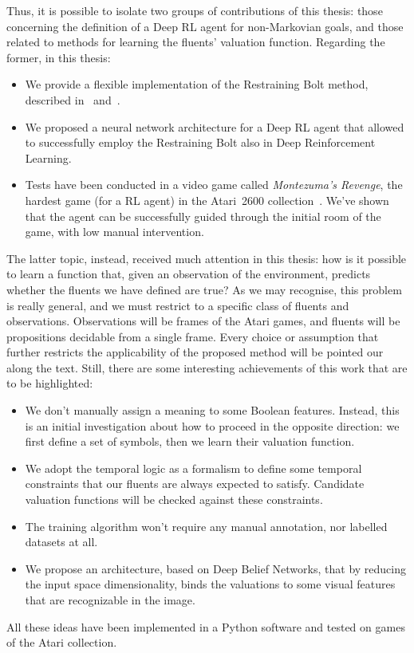 Thus, it is possible to isolate two groups of contributions of this thesis:
those concerning the definition of a Deep RL agent for non-Markovian goals,
and those related to methods for learning the fluents' valuation function.
Regarding the former, in this thesis:
\begin{itemize}
		\item We provide a flexible implementation of the Restraining Bolt method,
			described in~\cite{bib:bolt} and~\cite{bib:degiacomo-logic-nmrdp}.
		\item We proposed a neural network architecture for a Deep RL agent that
			allowed to successfully employ the Restraining Bolt also in Deep
			Reinforcement Learning.
		\item Tests have been conducted in a video game called \emph{Montezuma's
			Revenge}, the hardest game (for a RL agent) in the Atari~2600
			collection~\cite{bib:atari-deepq-nature}. We've shown that the agent can
			be successfully guided through the initial room of the game, with low
			manual intervention.
\end{itemize}

The latter topic, instead, received much attention in this thesis: how is it
possible to learn a function that, given an observation of the environment,
predicts whether the fluents we have defined are true? As we may recognise,
this problem is really general, and we must restrict to a specific class of
fluents and observations. Observations will be frames of the Atari games, and
fluents will be propositions decidable from a single frame. Every choice or
assumption that further restricts the applicability of the proposed method
will be pointed our along the text. Still, there are some interesting
achievements of this work that are to be highlighted:
\begin{itemize}
	\item We don't manually assign a meaning to some Boolean features.
		Instead, this is an initial investigation about how to proceed in the
		opposite direction: we first define a set of symbols, then we learn their
		valuation function.
	\item We adopt the temporal logic \ldl{} as a formalism to define some
		temporal constraints that our fluents are always expected to satisfy.
		Candidate valuation functions will be checked against these constraints.
	\item The training algorithm won't require any manual annotation,
		nor labelled datasets at all.
	\item We propose an architecture, based on Deep Belief Networks, that by
		reducing the input space dimensionality, binds the valuations to some
		visual features that are recognizable in the image.
\end{itemize}
All these ideas have been implemented in a Python software and tested on games
of the Atari collection.

